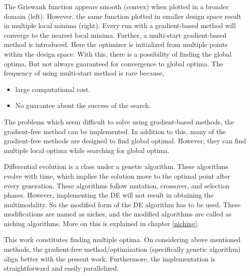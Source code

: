 The Griewank function appears smooth (convex) when plotted in a broader domain (left). However, the same function plotted in smaller design space result in multiple local minima (right). Every run with a gradient-based method will converge to the nearest local minima. Further, a multi-start gradient-based method is introduced. Here the optimizer is initialized from multiple points within the design space. With this, there is a possibility of finding the global optima, But not always guaranteed for convergence to global optima. The frequency of using multi-start method is rare because,
\begin{itemize}
\item  large computational cost.
\item  No guarantee about the success of the search.
\end{itemize}

The problems which seem difficult to solve using gradient-based methods, the gradient-free method can be implemented. In addition to this, many of the gradient-free methods are designed to find global optimal. However, they can find multiple local optima while searching for global optima.

Differential evolution is a class under a genetic algorithm. These algorithms evolve with time, which implies the solution move to the optimal point after every generation. These algorithms follow mutation, crossover, and selection phases. However, implementing the DE will not result in obtaining the multimodality. So the modified form of the DE algorithm has to be used. These modifications are named as niches, and the modified algorithms are called as niching algorithms. More on this is explained in chapter \ref{niching}.

This work constitutes finding multiple optima. On considering above mentioned methods, the gradient-free method/optimization (specifically genetic algorithm) align better with the present work. Furthermore, the implementation is straightforward and easily parallelized.

